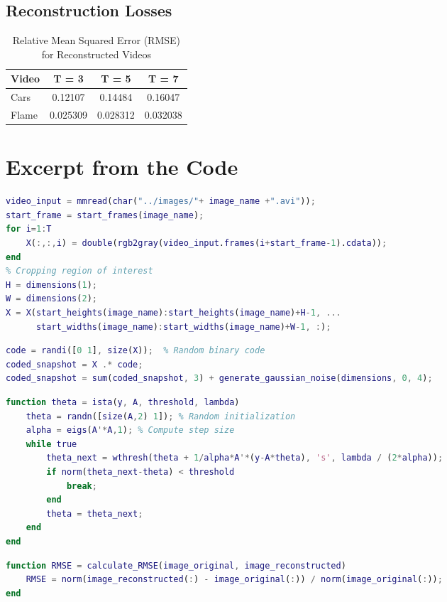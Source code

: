 \documentclass{article}
\begin{document}
\begin{enumerate}
\subsection{Reconstruction Losses}
\begin{table}[h!]
    \centering
    \caption{Relative Mean Squared Error (RMSE) for Reconstructed Videos}
    \label{tab:rmse_results}
    \begin{tabular}{|l|c|c|c|}
        \hline
        \textbf{Video} & \textbf{T = 3} & \textbf{T = 5} & \textbf{T = 7} \\
        \hline
        Cars  & 0.12107 & 0.14484 & 0.16047 \\
        Flame & 0.025309 & 0.028312 & 0.032038 \\
        \hline
    \end{tabular}
\end{table}

\section{Excerpt from the Code}
\begin{lstlisting}[language=Matlab, caption=Reading and Preprocessing the Video, label=code:read_video]
% Read and preprocess video
video_input = mmread(char("../images/"+ image_name +".avi"));
start_frame = start_frames(image_name);
for i=1:T
    X(:,:,i) = double(rgb2gray(video_input.frames(i+start_frame-1).cdata));
end
% Cropping region of interest
H = dimensions(1);
W = dimensions(2);
X = X(start_heights(image_name):start_heights(image_name)+H-1, ...
      start_widths(image_name):start_widths(image_name)+W-1, :);
\end{lstlisting}

\begin{lstlisting}[language=Matlab, caption=Generating Coded Snapshot, label=code:coded_snapshot]
% Generate coded snapshot
code = randi([0 1], size(X));  % Random binary code
coded_snapshot = X .* code;
coded_snapshot = sum(coded_snapshot, 3) + generate_gaussian_noise(dimensions, 0, 4);
\end{lstlisting}

\begin{lstlisting}[language=Matlab, caption=ISTA Algorithm for Reconstruction, label=code:ista]
function theta = ista(y, A, threshold, lambda)
    theta = randn([size(A,2) 1]); % Random initialization
    alpha = eigs(A'*A,1); % Compute step size
    while true
        theta_next = wthresh(theta + 1/alpha*A'*(y-A*theta), 's', lambda / (2*alpha));
        if norm(theta_next-theta) < threshold
            break;
        end
        theta = theta_next;
    end
end
\end{lstlisting}

\begin{lstlisting}[language=Matlab, caption=Calculating RMSE, label=code:rmse]
function RMSE = calculate_RMSE(image_original, image_reconstructed)
    RMSE = norm(image_reconstructed(:) - image_original(:)) / norm(image_original(:));
end
\end{lstlisting}


\end{enumerate}
\end{document}
